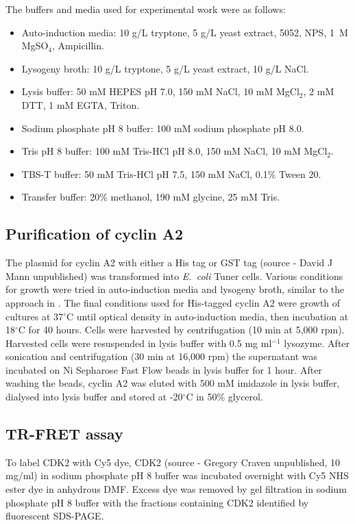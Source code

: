 The buffers and media used for experimental work were as follows:
\begin{itemize}
\item Auto-induction media: 10 g/L tryptone, 5 g/L yeast extract, 5052, NPS, 1~M MgSO$_{4}$, Ampicillin.
\item Lysogeny broth: 10 g/L tryptone, 5 g/L yeast extract, 10 g/L NaCl.
\item Lysis buffer: 50 mM HEPES pH 7.0, 150 mM NaCl, 10 mM MgCl$_{2}$, 2 mM DTT, 1 mM EGTA, Triton.
\item Sodium phosphate pH 8 buffer: 100 mM sodium phosphate pH 8.0.
\item Tris pH 8 buffer: 100 mM Tris-HCl pH 8.0, 150 mM NaCl, 10 mM MgCl$_{2}$.
\item TBS-T buffer: 50 mM Tris-HCl pH 7.5, 150 mM NaCl, 0.1\% Tween 20.
\item Transfer buffer: 20\% methanol, 190 mM glycine, 25 mM Tris.
\end{itemize}


\subsection{Purification of cyclin A2}

The plasmid for cyclin A2 with either a His tag or GST tag (source - David J Mann unpublished) was transformed into \textit{E.\ coli} Tuner cells.
Various conditions for growth were tried in auto-induction media and lysogeny broth, similar to the approach in \cite{Wang2007}.
The final conditions used for His-tagged cyclin A2 were growth of cultures at 37$^{\circ}$C until optical density in auto-induction media, then incubation at 18$^{\circ}$C for 40 hours.
Cells were harvested by centrifugation (10 min at 5,000 rpm).
Harvested cells were resuspended in lysis buffer with 0.5 mg ml$^{-1}$ lysozyme.
After sonication and centrifugation (30 min at 16,000 rpm) the supernatant was incubated on Ni Sepharose Fast Flow beads in lysis buffer for 1 hour.
After washing the beads, cyclin A2 was eluted with 500 mM imidazole in lysis buffer, dialysed into lysis buffer and stored at -20$^{\circ}$C in 50\% glycerol.


\subsection{TR-FRET assay}

To label CDK2 with Cy5 dye, CDK2 (source - Gregory Craven unpublished, 10 mg/ml) in sodium phosphate pH 8 buffer was incubated overnight with Cy5 NHS ester dye in anhydrous DMF.
Excess dye was removed by gel filtration in sodium phosphate pH 8 buffer with the fractions containing CDK2 identified by fluorescent SDS-PAGE.

